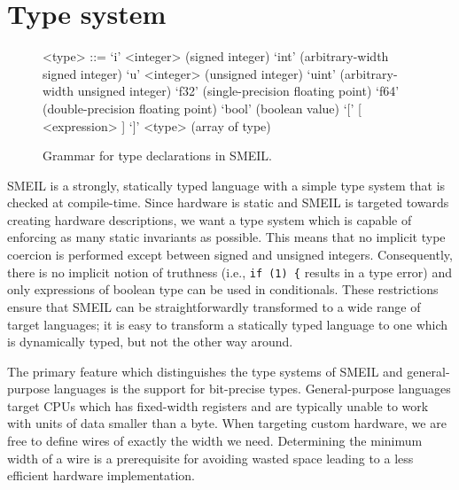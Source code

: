 
\section{Type system}
\label{sec:typesys}

\begin{figure}
\begin{grammar}
  <type> ::= `i' <integer> (signed integer)
  \alt `int' (arbitrary-width signed integer)
  \alt `u' <integer> (unsigned integer)
  \alt `uint' (arbitrary-width unsigned integer)
  \alt `f32' (single-precision floating point)
  \alt `f64' (double-precision floating point)
  \alt `bool' (boolean value)
  \alt `[' [ <expression> ] `]' <type> (array of type)
\end{grammar}
\caption{Grammar for type declarations in SMEIL.}
\label{fig:smeilgrm}
\end{figure}

SMEIL is a strongly, statically typed language with a simple type system that is
checked at compile-time.  Since hardware is static and SMEIL is targeted towards
creating hardware descriptions, we want a type system which is capable of
enforcing as many static invariants as possible. This means that no implicit
type coercion is performed except between signed and unsigned integers.
Consequently, there is no implicit notion of truthness (i.e., \texttt{if (1) \{}
results in a type error) and only expressions of boolean type can be used in
conditionals. These restrictions ensure that SMEIL can be
straightforwardly transformed to a wide range of target languages; it is easy to
transform a statically typed language to one which is dynamically typed, but not
the other way around.

The primary feature which distinguishes the type systems of SMEIL and
general-purpose languages is the support for bit-precise types. General-purpose
languages target CPUs which has fixed-width registers and are typically unable
to work with units of data smaller than a byte. When targeting custom hardware,
we are free to define wires of exactly the width we need. Determining the
minimum width of a wire is a prerequisite for avoiding wasted space leading to a
less efficient hardware implementation.

